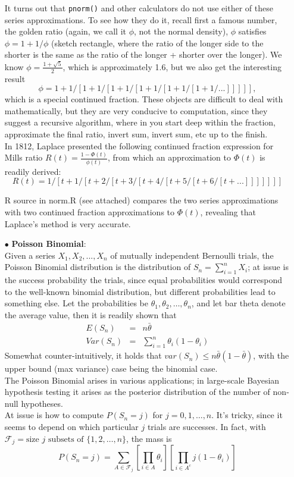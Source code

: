 \documentclass[11pt,a4paper]{article}
\begin{document}
\begin{itemize}
It turns  out that \texttt{pnorm()} and other calculators do not use either of these series approximations.  To see how they do it, recall first a famous number, the golden ratio (again, we call it $\phi$, not the normal density), $\phi$ satisfies $\phi = 1 + 1/\phi$ (sketch rectangle, where the ratio of the longer side to the shorter is the same as the ratio of the longer + shorter over the longer).  We know $\phi = \frac{1+\sqrt{5}}{2}$, which is approximately 1.6, but we also get the interesting result
   $$\phi = 1 + 1/[ 1 + 1/[1+1/[1+1/[1+1/[1+1/...] ] ] ] ],$$
which is a special continued fraction. These objects are difficult to deal with mathematically, but they are very conducive to computation, since they suggest a recursive algorithm, where in you start deep within the fraction, approximate the final ratio, invert sum, invert sum, etc up to the finish.\\  
In 1812, Laplace presented the following continued fraction expression for Mills ratio $R(t) = \frac{1-\Phi(t)}{\phi(t)}$, from which an approximation to $\Phi(t)$ is readily derived:
 $$R(t) = 1/[ t + 1/[t+2/[t+3/[t+4/[t+5/[t+6/[t+...]]]]]]]$$

R source in norm.R (see attached) compares the two series approximations with two continued fraction approximations to $\Phi(t)$, revealing that Laplace's method is very accurate.
\item[$\bullet$] \textbf{Poisson Binomial}:\\
Given a series $X_1, X_2, ..., X_n$ of mutually independent Bernoulli trials, the Poisson Binomial distribution is the distribution of $S_n = \sum_{i=1}^n X_i$; at issue is the success probability the trials, since equal probabilities would correspond to the well-known binomial distribution, but different probabilities lead to something else.   Let the probabilities be $\theta_1, \theta_2,\ldots, \theta_n$, and let bar theta denote the average value, then it is readily shown that
\begin{eqnarray*}
E(S_n) &=& n \bar{\theta}\\
Var(S_n) &=& \sum_{i=1}^n \theta_i (1-\theta_i)
\end{eqnarray*}
Somewhat counter-intuitively, it holds that $var(S_n) \leq n \bar{\theta} (1 - \bar{\theta})$,  with the upper bound (max variance) case being the binomial case.\\
The Poisson Binomial arises in various applications; in large-scale Bayesian hypothesis testing it arises as the posterior distribution of the number of non-null hypotheses.\\
At issue is how to compute $P(S_n=j)$ for $j=0,1,\ldots,n$.  It's tricky, since it seems to depend on which particular $j$ trials are successes. In fact, with $\mathcal{ F}_j = { \text{size } j \text{ subsets of } \{1,2,\ldots,n\} }$, the mass is
$$P(S_n = j) = \sum_{ A \in \mathcal{ F}_j }  \left[  \prod_{i \in A} \theta_i \right] \left[ \prod_{i \in A^c }j (1-\theta_i) \right]$$


\end{itemize}
\end{document}
